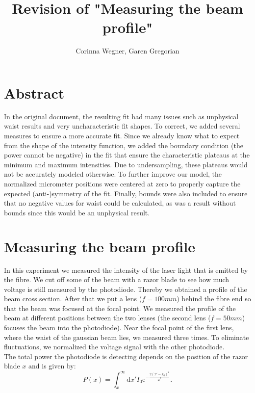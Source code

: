 \documentclass{article}
\title{Revision of "Measuring the beam profile"}
\author{Corinna Wegner, Garen Gregorian}
\begin{document}
\maketitle
\section{Abstract} 
In the original document, the resulting fit had many issues such as unphysical waist results and very uncharacteristic fit shapes. To correct, we added several measures to ensure a more accurate fit. Since we already know what to expect from the shape of the intensity function, we added the boundary condition (the power cannot be negative) in the fit that ensure the characteristic plateaus at the minimum and maximum intensities. Due to undersampling, these plateaus would not be accurately modeled otherwise. To further improve our model, the normalized micrometer positions were centered at zero to properly capture the expected (anti-)symmetry of the fit. Finally, bounds were also included to ensure that no negative values for waist could be calculated, as was a result without bounds since this would be an unphysical result.

\section{Measuring the beam profile}

In this experiment we measured the intensity of the laser light that is emitted by the fibre. We cut off some of the beam with a razor blade to see how much voltage is still measured by the photodiode. Thereby we obtained a profile of the beam cross section. After that we put a lens ($f=100mm$) behind the fibre end so that the beam was focused at the focal point. We measured the profile of the beam at different positions between the two lenses (the second lens ($f=50mm$) focuses the beam into the photodiode). Near the focal point of the first lens, where the waist of the gaussian beam lies, we measured three times. To eliminate fluctuations, we normalized the voltage signal with the other photodiode.\\

The total power the photodiode is detecting depends on the position of the razor blade $x$ and is given by:
\begin{equation}
P(x) = \int_x^\infty\mathrm{d}x' I_0 \mathrm{e}^{-\frac{2(x'-x_0)^2}{\omega^2}}.
\label{powerintegral}
\end{equation}
\end{document}

